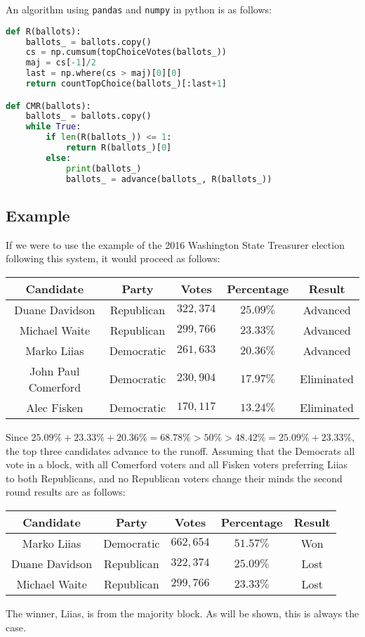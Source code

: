 \documentclass{article}
\begin{document}
An algorithm using \texttt{pandas} and \texttt{numpy} in python is as follows:
\begin{lstlisting}[language=Python]
def R(ballots):
    ballots_ = ballots.copy()
    cs = np.cumsum(topChoiceVotes(ballots_))
    maj = cs[-1]/2
    last = np.where(cs > maj)[0][0]
    return countTopChoice(ballots_)[:last+1]

def CMR(ballots):
    ballots_ = ballots.copy()
    while True:
        if len(R(ballots_)) <= 1:
            return R(ballots_)[0]
        else:
            print(ballots_)
            ballots_ = advance(ballots_, R(ballots_))
\end{lstlisting}

\subsection{Example}

If we were to use the example of the 2016 Washington State Treasurer election following this system, it would proceed as follows:
\begin{table}[H]\centering
\begin{tabular}{|c|c|c|c|c|}
\hline\rowcolor{headc}
Candidate & Party & Votes & Percentage & Result\\
\hline\rowcolor{advc}
Duane Davidson & Republican & $322,374$ & $25.09\%$ & Advanced \\
\hline \rowcolor{advc}
Michael Waite & Republican & $299,766$ & $23.33\%$ & Advanced \\
\hline \rowcolor{advc}
Marko Liias & Democratic & $261,633$ & $20.36\%$ & Advanced \\
\hline 
John Paul Comerford & Democratic & $230,904$ & $17.97\%$ & Eliminated\\
\hline 
Alec Fisken & Democratic & $170,117$ & $13.24\%$ & Eliminated\\
\hline
\end{tabular}
\end{table}
Since $25.09\% + 23.33\% + 20.36\% = 68.78\% > 50\% > 48.42\% = 25.09\% + 23.33\%$, the top three candidates advance to the runoff. Assuming that the Democrats all vote in a block, with all Comerford voters and all Fisken voters preferring Liias to both Republicans, and no Republican voters change their minds the second round results are as follows:
\begin{table}[H]\centering
\begin{tabular}{|c|c|c|c|c|}
\hline\rowcolor{headc}
Candidate & Party & Votes & Percentage & Result\\
\hline \rowcolor{advc}
Marko Liias & Democratic & $662,654$ & $51.57\%$ & Won \\
\hline
Duane Davidson & Republican & $322,374$ & $25.09\%$ & Lost \\
\hline
Michael Waite & Republican & $299,766$ & $23.33\%$ & Lost \\
\hline
\end{tabular}
\end{table}
The winner, Liias, is from the majority block. As will be shown, this is always the case.
\end{document}

